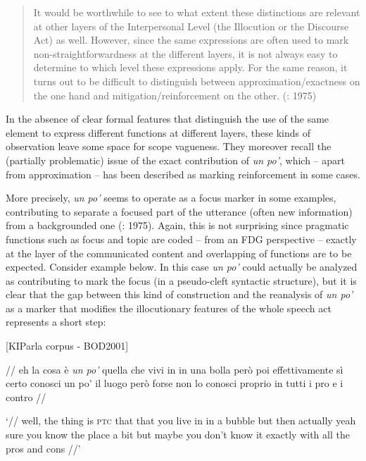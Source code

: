\begin{quote}
It would be worthwhile to see to what extent these distinctions are relevant at other layers of the Interpersonal Level (the Illocution or the Discourse Act) as well. However, since the same expressions are often used to mark non-straightforwardness at the different layers, it is not always easy to determine to which level these expressions apply. For the same reason, it turns out to be difficult to distinguish between approximation/exactness on the one hand and mitigation/reinforcement on the other. (\citealt{HengeveldKeizer2011}: 1975)
\end{quote}

In the absence of clear formal features that distinguish the use of the same element to express different functions at different layers, these kinds of observation leave some space for scope vagueness. They moreover recall the (partially problematic) issue of the exact contribution of \textit{un po’}, which – apart from approximation – has been described as marking reinforcement in some cases.

More precisely, \textit{un po’} seems to operate as a focus marker in some examples, contributing to separate a focused part of the utterance (often new information) from a backgrounded one (\citealt{HengeveldKeizer2011}: 1975). Again, this is not surprising since pragmatic functions such as focus and topic are coded – from an FDG perspective – exactly at the layer of the communicated content and overlapping of functions are to be expected. Consider example  below. In this case \textit{un po’} could actually be analyzed as contributing to mark the focus (in a pseudo-cleft syntactic structure), but it is clear that the gap between this kind of construction and the reanalysis of \textit{un po’} as a marker that modifies the illocutionary features of the whole speech act represents a short step:

\ea%
    \label{ex:key:86}

          [KIParla corpus - BOD2001]

// eh la cosa è \textit{un po’} quella che vivi in in una bolla però poi effettivamente sì certo conosci un po’ il luogo però forse non lo conosci proprio in tutti i pro e i contro //

\glt ‘// well, the thing is \textsc{ptc} that that you live in in a bubble but then actually yeah sure you know the place a bit but maybe you don’t know it exactly with all the pros and cons //’
    \z %

